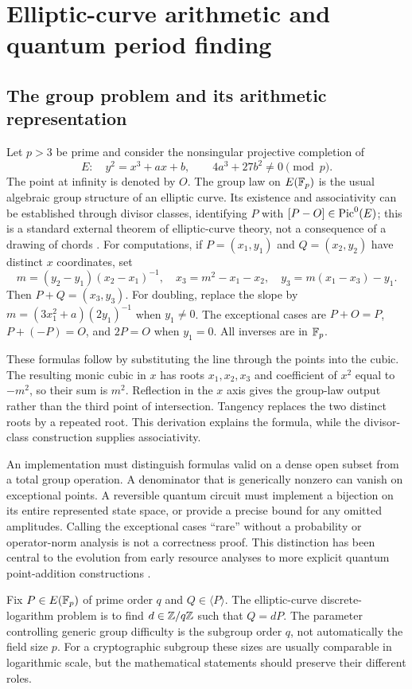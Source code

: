 \chapter{Elliptic-curve arithmetic and quantum period finding}
\label{ch:quantum-crypto}
\section{The group problem and its arithmetic representation}
Let $p>3$ be prime and consider the nonsingular projective completion of
\[
 E:\quad y^2=x^3+ax+b,\qquad 4a^3+27b^2\ne0\pmod p.
\]
The point at infinity is denoted by $O$. The group law on $E(\mathbb{F}_p)$ is the usual algebraic group structure of an elliptic curve. Its existence and associativity can be established through divisor classes, identifying $P$ with $[P-O]\in\operatorname{Pic}^0(E)$; this is a standard external theorem of elliptic-curve theory, not a consequence of a drawing of chords \cite{SilvermanAEC}. For computations, if $P=(x_1,y_1)$ and $Q=(x_2,y_2)$ have distinct $x$ coordinates, set
\[
 m=(y_2-y_1)(x_2-x_1)^{-1},\quad
 x_3=m^2-x_1-x_2,\quad y_3=m(x_1-x_3)-y_1.
\]
Then $P+Q=(x_3,y_3)$. For doubling, replace the slope by
$m=(3x_1^2+a)(2y_1)^{-1}$ when $y_1\ne0$. The exceptional cases are
$P+O=P$, $P+(-P)=O$, and $2P=O$ when $y_1=0$. All inverses are in $\mathbb{F}_p$.

These formulas follow by substituting the line through the points into the cubic. The resulting monic cubic in $x$ has roots $x_1,x_2,x_3$ and coefficient of $x^2$ equal to $-m^2$, so their sum is $m^2$. Reflection in the $x$ axis gives the group-law output rather than the third point of intersection. Tangency replaces the two distinct roots by a repeated root. This derivation explains the formula, while the divisor-class construction supplies associativity.

An implementation must distinguish formulas valid on a dense open subset from a total group operation. A denominator that is generically nonzero can vanish on exceptional points. A reversible quantum circuit must implement a bijection on its entire represented state space, or provide a precise bound for any omitted amplitudes. Calling the exceptional cases ``rare'' without a probability or operator-norm analysis is not a correctness proof. This distinction has been central to the evolution from early resource analyses to more explicit quantum point-addition constructions \cite{ProosZalka,Roetteler,Luo2026}.

Fix $P\in E(\mathbb{F}_p)$ of prime order $q$ and $Q\in\langle P\rangle$. The elliptic-curve discrete-logarithm problem is to find $d\in\mathbb{Z}/q\mathbb{Z}$ such that $Q=dP$. The parameter controlling generic group difficulty is the subgroup order $q$, not automatically the field size $p$. For a cryptographic subgroup these sizes are usually comparable in logarithmic scale, but the mathematical statements should preserve their different roles.

